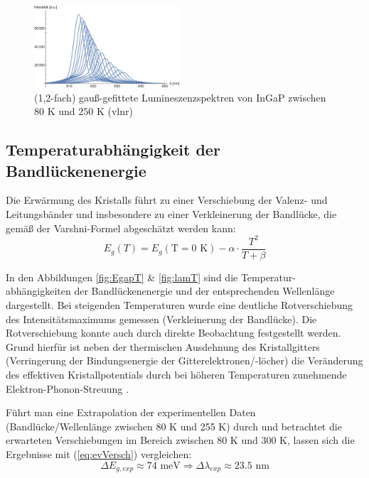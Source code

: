 \documentclass[aps,twocolumn,secnumarabic,nobalancelastpage,amsmath,amssymb,
nofootinbib,superscriptaddress]{revtex4-1}
\begin{document}
\begin{figure}[t]
  \centering
  \includegraphics[width=0.48\textwidth]{../Messung/allfitsplot.eps}
  \caption{\label{fig:spek} (1,2-fach) gauß-gefittete Lumineszenzspektren von InGaP zwischen $80\text{ K}$ und $250\text{ K}$ (vlnr)}
\end{figure}

\subsection{Temperaturabhängigkeit der Bandlückenenergie}

\noindent Die Erwärmung des Kristalls führt zu einer Verschiebung der Valenz- und Leitungsbänder und insbesondere
zu einer Verkleinerung der Bandlücke, die gemäß der Varshni-Formel abgeschätzt werden kann:
\begin{equation}
  E_g(T) = E_g(\text{T}=0\text{ K})-\alpha\cdot\frac{T^2}{T+\beta}
   \label{eq:varshni}
\end{equation}

\noindent In den Abbildungen \ref{fig:EgapT} \& \ref{fig:lamT} sind die Temperatur-
abhängigkeiten der Bandlückenenergie und der entsprechenden Wellenlänge dargestellt. Bei steigenden Temperaturen wurde eine deutliche
Rotverschiebung des Intensitätsmaximums gemessen (Verkleinerung der Bandlücke). Die Rotverschiebung konnte auch durch
direkte Beobachtung festgestellt werden. Grund hierfür ist neben der thermischen Ausdehnung des Kristallgitters (Verringerung
der Bindungsenergie der Gitterelektronen/-löcher) die Veränderung des effektiven Kristallpotentials durch bei höheren Temperaturen
zunehmende Elektron-Phonon-Streuung \cite{kittel}.

Führt man eine Extrapolation der experimentellen Daten (Bandlücke/Wellenlänge zwischen 80 K und 255 K) durch und
betrachtet die erwarteten Verschiebungen im Bereich zwischen 80 K und 300 K, lassen sich die Ergebnisse mit (\ref{eq:evVersch})
vergleichen:
\begin{equation}
  \Delta E_{g,exp}\approx 74\text{ meV} \Rightarrow \Delta\lambda_{exp}\approx 23.5\text{ nm}
   \label{eq:expVersch}
\end{equation}
\end{document}
